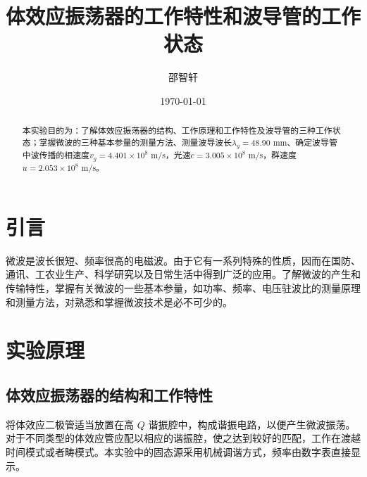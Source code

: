 \documentclass[aps,pre,12pt,preprint,onecolumn,showpacs,showkeys]{revtex4-1}
\begin{document}
\title{\bf\heiti{}体效应振荡器的工作特性和波导管的工作状态\vspace{15mm}}
\author{\fangsong{}邵智轩\vspace{2mm}}
\date{\today}

\begin{abstract}
\vspace{10mm}
\begin{spacing}{1.5}
\songti{}
本实验目的为：了解体效应振荡器的结构、工作原理和工作特性及波导管的三种工作状态；掌握微波的三种基本参量的测量方法、测量波导波长$\lambda_g=48.90$ mm、确定波导管中波传播的相速度$v_g=4.401\times 10^8$ m/s，光速$c=3.005\times 10^8$ m/s，群速度$u=2.053\times 10^8$ m/s。

\end{spacing}
\end{abstract}
\maketitle
\songti{}

\section{引言}
微波是波长很短、频率很高的电磁波。由于它有一系列特殊的性质，因而在国防、通讯、工农业生产、科学研究以及日常生活中得到广泛的应用。了解微波的产生和传输特性，掌握有关微波的一些基本参量，如功率、频率、电压驻波比的测量原理和测量方法，对熟悉和掌握微波技术是必不可少的。

\section{实验原理}
    \subsection{体效应振荡器的结构和工作特性}
    将体效应二极管适当放置在高 $Q$ 谐振腔中，构成谐振电路，以便产生微波振荡。对于不同类型的体效应管应配以相应的谐振腔，使之达到较好的匹配，工作在渡越时间模式或者畴模式。本实验中的固态源采用机械调谐方式，频率由数字表直接显示。
\end{document}
